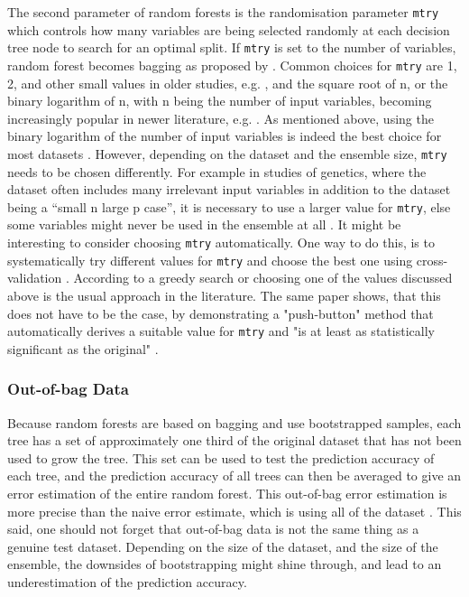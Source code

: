 \documentclass[a4paper,man,12pt,apacite,floatsintext,draftfirst]{apa6} %
\begin{document}
The second parameter of random forests is the randomisation parameter
\texttt{mtry} which controls how many variables are being selected randomly
at each decision tree node to search for an optimal split.
If \texttt{mtry} is set to the number of variables, random forest becomes
bagging as proposed by .
Common choices for \texttt{mtry} are 1, 2, and other small values in
older studies, e.g. , and the square root of n,
or the binary logarithm of n, with n being the number of input variables,
becoming increasingly popular in newer literature, e.g.
.
As mentioned above, using the binary logarithm of the number of
input variables is indeed the best choice for most datasets
\cite{banfield2007comparison}.
However, depending on the dataset and the ensemble size, \texttt{mtry}
needs to be chosen differently.
For example in studies of genetics, where the dataset often includes many
irrelevant input variables in addition to the dataset being a
“small n large p case”, it is necessary to use a larger value
for \texttt{mtry}, else some variables might never be used in the ensemble
at all \cite{strobl2009introduction}.
It might be interesting to consider choosing \texttt{mtry} automatically.
One way to do this, is to systematically try different values for \texttt{mtry}
and choose the best one using cross-validation \cite{psymeth}.
According to  a greedy search or choosing one of
the values discussed above is the usual approach in the literature.
The same paper shows, that this does not have to be the case, by demonstrating
a "push-button" method that automatically derives a suitable value for
\texttt{mtry} and "is at least as statistically significant as the original"
\cite{bernard2008forest}.

\subsubsection{Out-of-bag Data}
Because random forests are based on bagging and use bootstrapped samples,
each tree has a set of approximately one third of the original dataset
that has not been used to grow the tree.
This set can be used to test the prediction accuracy of each tree,
and the prediction accuracy of all trees can then be averaged to give an
error estimation of the entire random forest.
This out-of-bag error estimation is more precise than the naive error
estimate, which is using all of the dataset \cite{strobl2009introduction}.
This said, one should not forget that out-of-bag data is not the
same thing as a genuine test dataset.
Depending on the size of the dataset, and the size of the ensemble,
the downsides
of bootstrapping might shine through, and lead to an underestimation of
the prediction accuracy.
\end{document}
